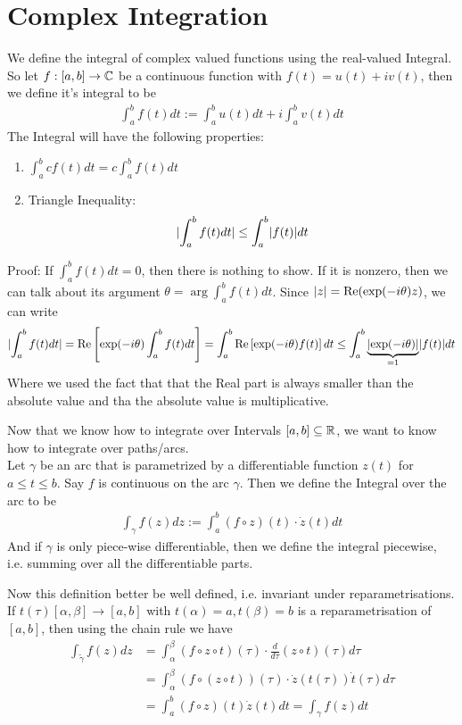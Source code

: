 \section{Complex Integration}

We define the integral of complex valued functions using the real-valued Integral. So let $f:[a,b] \to \mathbb{C}$ be a continuous function with $f(t) = u(t) + iv(t)$, then we define it's integral to be
\begin{align*}
	\int_{a}^{b}f(t) dt := \int_{a}^{b}u(t) dt + i \int_{a}^{b}v(t) dt
\end{align*}
The Integral will have the following properties:
\begin{enumerate}
	\item $\int_{a}^{b} c f(t) dt = c \int_{a}^{b}f(t) dt$
	\item Triangle Inequality:
		\begin{align*}
			\abs{\int_{a}^{b}f(t) dt}	\leq \int_{a}^{b} \abs{f(t)}dt
		\end{align*}
\end{enumerate}
Proof: If $\int_{a}^{b}f(t) dt = 0$, then there is nothing to show. If it is nonzero, then we can talk about its argument $\theta = \arg \int_{a}^{b}f(t) dt$. 
Since $\vert z\vert = \text{Re}(\exp(-i \theta)z)$, we can write
\begin{align*}
	\abs{\int_{a}^{b}f(t) dt}	= \text{Re} \left[\exp(-i \theta) \int_{a}^{b}f(t) dt \right] = \int_{a}^{b} \text{Re} \left[\exp(-i \theta) f(t) \right] dt \leq \int_{a}^{b} \underbrace{\abs{\exp(-i \theta)}}_{= 1} \abs{f(t)}dt
\end{align*}
Where we used the fact that that the Real part is always smaller than the absolute value and tha the absolute value is multiplicative.

Now that we know how to integrate over Intervals $[a,b] \subseteq \mathbb{R}$, we want to know how to integrate over paths/arcs.\\

Let $\gamma$ be an arc that is parametrized by a differentiable function $z(t)$ for $a \leq t \leq b$.
Say $f$ is continuous on the arc $\gamma$. Then we define the Integral over the arc to be 
\begin{align*}
	\int_{\gamma} f(z) dz := \int_{a}^{b} (f \circ z)(t) \cdot \dot{z}(t) dt
\end{align*}
And if $\gamma$ is only piece-wise differentiable, then we define the integral piecewise, i.e. summing over all the differentiable parts.

Now this definition better be well defined, i.e. invariant under reparametrisations. If $t(\tau)[\alpha, \beta] \to [a,b]$ with $t(\alpha) = a, t(\beta) = b$ is a reparametrisation of $[a,b]$, then using the chain rule we have
\begin{align*}
 \int_{\tilde{\gamma}} f(z) dz &= \int_{\alpha}^{\beta}(f \circ z \circ t)(\tau) \cdot \frac{d}{d \tau}(z \circ t)(\tau) d \tau \\
															 &= \int_{\alpha}^{\beta} (f \circ (z \circ t))(\tau) \cdot \dot{z}(t(\tau)) \dot{t}(\tau) d \tau\\
															 &= \int_{a}^{b} (f \circ z)(t) \dot{z}(t) dt = \int_{\gamma}f(z) dt
\end{align*}

